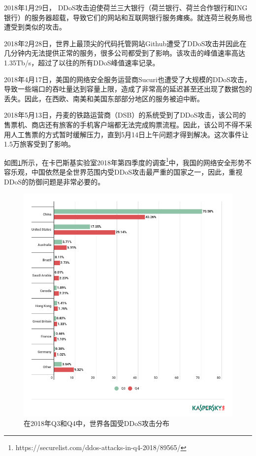 2018年1月29日， DDoS攻击迫使荷兰三大银行（荷兰银行、荷兰合作银行和ING银行）的服务器超载，导致它们的网站和互联网银行服务瘫痪。就连荷兰税务局也遭受到类似的攻击。

2018年2月28日，世界上最顶尖的代码托管网站Github遭受了DDoS攻击并因此在几分钟内无法提供正常的服务，很多公司都受到了影响。该攻击的峰值速率高达1.35Tb/s，超过了以往的所有DDoS峰值速率记录。

2018年4月17日，美国的网络安全服务运营商Sucuri也遭受了大规模的DDoS攻击，导致一些端口的吞吐量达到容量上限，造成了非常高的延迟甚至还出现了数据包的丢失。因此，在西欧、南美和美国东部部分地区的服务被迫中断。

2018年5月13日，丹麦的铁路运营商（DSB）的系统受到了DDoS攻击，该公司的售票机、商店还有旅客的手机客户端都无法完成购票流程。因此，该公司不得不采用人工售票的方式暂时缓解压力，直到5月14日上午问题才得到解决。这次事件让1.5万旅客受到了影响。

如图\ref{fig:ddos_countries}所示，在卡巴斯基实验室2018年第四季度的调查\footnote{https://securelist.com/ddos-attacks-in-q4-2018/89565/}中，我国的网络安全形势不容乐观，中国依然是全世界范围内受DDoS攻击最严重的国家之一，因此，重视DDoS的防御问题是非常必要的。

\begin{figure}
    \centering
    \includegraphics[scale=0.5]{figures/en-ddos-by-countries.png}
    \caption{在2018年Q3和Q4中，世界各国受DDoS攻击分布}
    \label{fig:ddos_countries}
\end{figure}

